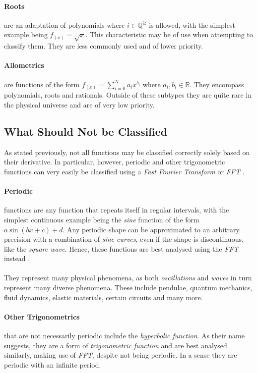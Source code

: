 \documentclass[main.tex]{subfiles}
\begin{document}
    \paragraph{Roots} are an adaptation of polynomials where $i \in \mathbb{Q}^\geq$ is allowed, with the simplest example being $f_{(x)}=\sqrt{x}$. This characteristic may be of use when attempting to classify them. They are less commonly used and of lower priority.
    \paragraph{Allometrics} are functions of the form $f_{(x)}=\sum_{i=0}^{N} a_i x^{b_i} $ where $a_i,b_i \in \mathbb{R}$. They encompass polynomials, roots and rationals. Outside of these subtypes they are quite rare in the physical universe and are of very low priority.
    
    \subsection{What Should Not be Classified}
    
    As stated previously, not all functions may be classified correctly solely based on their derivative. In particular, however, periodic and other trigonometric functions can very easily be classified using a \textit{Fast Fourier Transform} or \textit{FFT} \cite{}.
    \paragraph{Periodic} functions are any function that repeats itself in regular intervals, with the simplest continuous example being the \textit{sine} function of the form $a \sin(b x + c) + d$. Any periodic shape can be approximated to an arbitrary precision with a combination of \textit{sine curves}, even if the shape is discontinuous, like the \textit{square wave}. Hence, these functions are best analysed using the \textit{FFT} instead \cite{}.
    \\\\
    They represent many physical phenomena, as both \textit{oscillations} and \textit{waves} in turn represent many diverse phenomena. These include pendulae, quantum mechanics, fluid dynamics, elastic materials, certain circuits and many more.
    \paragraph{Other Trigonometrics} that are not necessarily periodic include the \textit{hyperbolic function}. As their name suggests, they are a form of \textit{trigonometric function} and are best analysed similarly, making use of \textit{FFT}, despite not being periodic. In a sense they are periodic with an infinite period. 
    
\end{document}
